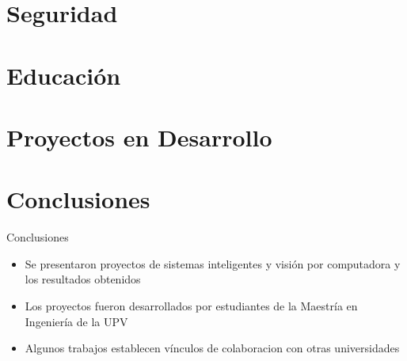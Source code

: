 \documentclass[aspectratio=169,compress]{beamer}
\begin{document}




\section{Seguridad} %











\section{Educación} %









%



\section{Proyectos en Desarrollo} %







\section{Conclusiones}
\begin{frame}{Conclusiones}
\begin{itemize}
\item Se presentaron proyectos de sistemas inteligentes y visión por computadora y los resultados obtenidos
\item Los proyectos fueron desarrollados por estudiantes de la Maestría en Ingeniería de la UPV
\item Algunos trabajos establecen vínculos de colaboracion con otras universidades
\end{itemize}
\end{frame}
\end{document}
